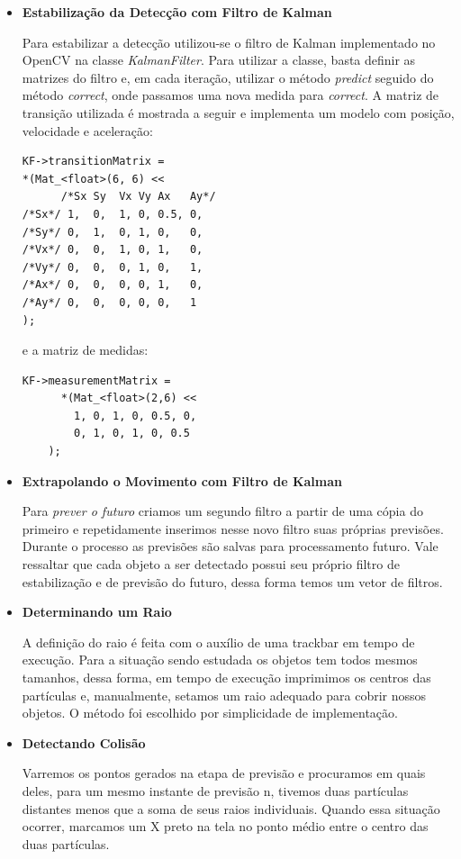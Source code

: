 \documentclass[journal]{IEEEtran}
\begin{document}
\begin{itemize}
\item \textbf{Estabilização da Detecção com Filtro de Kalman}

Para estabilizar a detecção utilizou-se o filtro de Kalman 
implementado no OpenCV na classe \textit{KalmanFilter}. Para utilizar
a classe, basta definir as matrizes do filtro e, em cada iteração, 
utilizar o método \textit{predict} seguido do método 
\textit{correct}, onde passamos uma nova medida para \textit{correct}.
A matriz de transição utilizada é mostrada a seguir e implementa um 
modelo com posição, velocidade e aceleração:

\begin{lstlisting}
KF->transitionMatrix =
*(Mat_<float>(6, 6) <<
      /*Sx Sy  Vx Vy Ax   Ay*/
/*Sx*/ 1,  0,  1, 0, 0.5, 0, 
/*Sy*/ 0,  1,  0, 1, 0,   0,
/*Vx*/ 0,  0,  1, 0, 1,   0,
/*Vy*/ 0,  0,  0, 1, 0,   1,
/*Ax*/ 0,  0,  0, 0, 1,   0,
/*Ay*/ 0,  0,  0, 0, 0,   1
);
\end{lstlisting}

e a matriz de medidas:

\begin{lstlisting}
KF->measurementMatrix =
      *(Mat_<float>(2,6) <<
	    1, 0, 1, 0, 0.5, 0,
	    0, 1, 0, 1, 0, 0.5
	);
\end{lstlisting}

\item \textbf{Extrapolando o Movimento com Filtro de Kalman}

Para \textit{prever o futuro} criamos um segundo filtro a partir
de uma cópia do primeiro e repetidamente inserimos nesse novo filtro
suas próprias previsões. Durante o processo as previsões são salvas 
para processamento futuro. Vale ressaltar que cada objeto a ser 
detectado possui seu próprio filtro de estabilização e de previsão do 
futuro, dessa forma temos um vetor de filtros.

\item \textbf{Determinando um Raio}

A definição do 
raio é feita com o auxílio de uma trackbar em tempo de execução.
Para a situação sendo estudada os objetos tem todos mesmos tamanhos, 
dessa forma, em tempo de execução imprimimos os centros das partículas
e, manualmente, setamos um raio adequado para cobrir nossos objetos.
O método foi escolhido por simplicidade de implementação.

\item \textbf{Detectando Colisão}

Varremos os pontos gerados na etapa de previsão e procuramos em quais 
deles, para um mesmo instante de previsão n, tivemos duas partículas
distantes menos que a soma de seus raios individuais. Quando essa
situação ocorrer, marcamos um X preto na tela no ponto médio entre o
centro das duas partículas.


\end{itemize}
\end{document}
